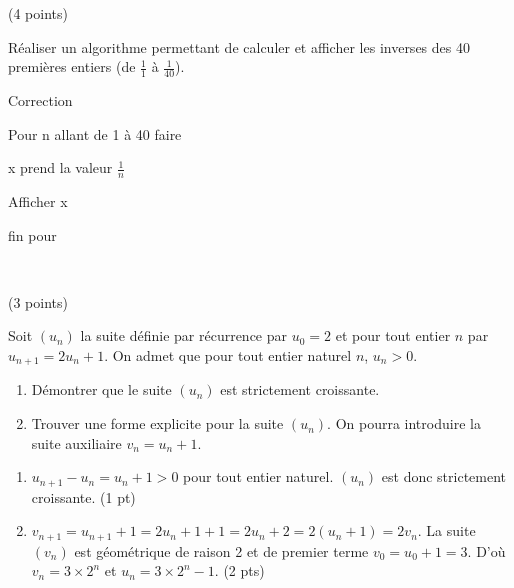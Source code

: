 \documentclass[a4paper,11pt]{article}
\theoremstyle{break}
\begin{document}
    
  \begin{exo}(4 points)
~
      \vspace{0.25cm}
      
      Réaliser un algorithme permettant de calculer et afficher les inverses des 40 premières entiers (de $\frac{1}{1}$ à $\frac{1}{40}$).
            
      
\begin{correction}

Correction

   Pour n allant de 1 \`a 40 faire
   
      x prend la valeur $\frac{1}{n}$
      
      Afficher x
      
   fin pour
      
      
      
\end{correction}      
      
      
\end{exo}  
    

 ~
  \vspace{1cm}
  

\begin{exo}(3 points)

Soit $(u_n)$ la suite définie par récurrence par $u_0=2$ et pour tout entier $n$ par 
$u_{n+1}=2 u_n +1$. On admet que pour tout entier naturel $n$, $u_n>0$.

\begin{enumerate}
  \item Démontrer que le suite $(u_n)$ est strictement croissante.
  \item Trouver une forme explicite pour la suite $(u_n)$. On pourra introduire la suite auxiliaire
  $v_n=u_n+1$.
\end{enumerate}

\begin{correction}
\begin{enumerate}
 \item $u_{n+1}-u_n=u_n+1>0$ pour tout entier naturel. $(u_n)$ est donc strictement croissante. (1 pt)
 \item $v_{n+1}=u_{n+1}+1=2 u_n+1+1=2 u_n +2=2(u_n+1)=2 v_n$. La suite $(v_n)$ est g\'eom\'etrique
  de raison 2 et de premier terme $v_0=u_0+1=3$. D'o\`u $v_n=3 \times 2^n$ et $u_n=3 \times 2^n-1$. (2 pts)
\end{enumerate}


\end{correction}

\begin{correction}

\end{correction}


\end{exo}


    
\end{document}
